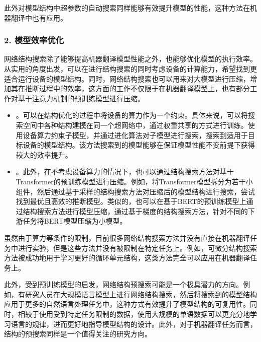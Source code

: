 \parinterval 此外对模型结构中超参数的自动搜索同样能够有效提升模型的性能，这种方法在机器翻译中也有应用。


\subsubsection{2. 模型效率优化}

\parinterval 网络结构搜索除了能够提高机器翻译模型性能之外，也能够优化模型的执行效率。从实用的角度出发，可以在进行结构搜索的同时考虑设备的计算能力，希望找到更适合运行设备的模型结构。同时，网络结构搜索也可以用来对大模型进行压缩，增加其在推断过程中的效率，这方面的工作不仅限于在机器翻译模型上，也有部分工作对基于注意力机制的预训练模型进行压缩。

\begin{itemize}
\vspace{0.5em}
\item {\small{}}。可以在结构优化的过程中将设备的算力作为一个约束。具体来说，可以将搜索空间中各种结构建模在同一个超网络中，通过权重共享的方式进行训练。使用设备算力约束子模型，并通过进化算法对子模型进行搜索，搜索到适用于目标设备的模型结构。该方法搜索到的模型能够在保证模型性能不变前提下获得较大的效率提升。
\vspace{0.5em}
\item {\small{}}。此外，在不考虑设备算力的情况下，也可以通过结构搜索方法对基于Transformer的预训练模型进行压缩。例如，将Transformer模型拆分为若干小组件，然后通过基于采样的结构搜索方法对压缩后的模型结构进行搜索，尝试找到最优且高效的推断模型。类似的，也可以在基于BERT的预训练模型上通过结构搜索方法进行模型压缩，通过基于梯度的结构搜索方法，针对不同的下游任务将BERT模型压缩为小模型。
\vspace{0.5em}
\end{itemize}

\parinterval 虽然由于算力等条件的限制，目前很多网络结构搜索方法并没有直接在机器翻译任务中进行实验，但是这些方法并没有被限制在特定任务上。例如，可微分结构搜索方法被成功地用于学习更好的循环单元结构，这类方法完全可以应用在机器翻译任务上。

\parinterval 此外，受到预训练模型的启发，网络结构预搜索可能是一个极具潜力的方向。例如，有研究人员在大规模语言模型上进行网络结构搜索，然后将搜索到的模型结构应用于更多的自然语言处理任务中，这种方式有效提升了模型结构的可复用性。同时，相较于使用受到特定任务限制的数据，使用大规模的单语数据可以更充分地学习语言的规律，进而更好地指导模型结构的设计。此外，对于机器翻译任务而言，结构的预搜索同样是一个值得关注的研究方向。

